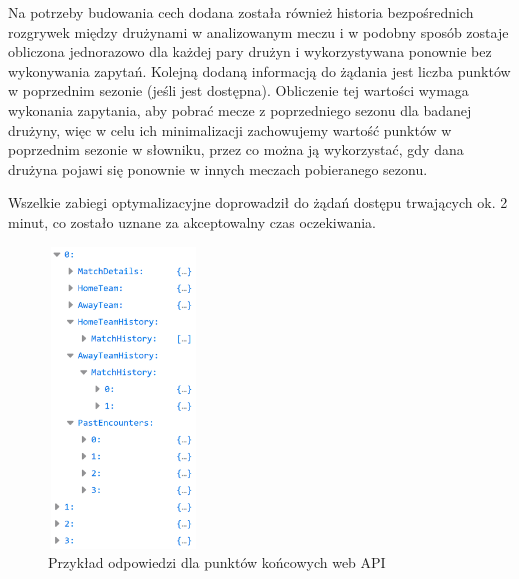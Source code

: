     Na potrzeby budowania cech dodana została również historia bezpośrednich rozgrywek między drużynami w analizowanym meczu i w podobny sposób zostaje obliczona jednorazowo dla każdej pary drużyn i wykorzystywana ponownie bez wykonywania zapytań. Kolejną dodaną informacją do żądania jest liczba punktów w poprzednim sezonie (jeśli jest dostępna). Obliczenie tej wartości wymaga wykonania zapytania, aby pobrać mecze z poprzedniego sezonu dla badanej drużyny, więc w celu ich minimalizacji zachowujemy wartość punktów w poprzednim sezonie w słowniku, przez co można ją wykorzystać, gdy dana drużyna pojawi się ponownie w innych meczach pobieranego sezonu.
    
    Wszelkie zabiegi optymalizacyjne doprowadził do żądań dostępu trwających ok. 2 minut, co zostało uznane za akceptowalny czas oczekiwania.
    
    \begin{figure}[H] 
        \centering\includegraphics[width=4cm,height=8cm]{figures/example_response.png}
        \caption{Przykład odpowiedzi dla punktów końcowych web API}
        \label{fig:example_API_response}
    \end{figure}
    
